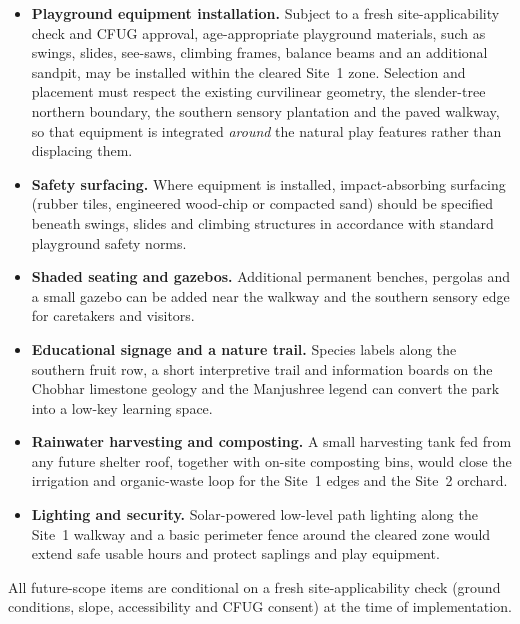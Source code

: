 \documentclass[11pt,a4paper]{article}
\begin{document}
\begin{itemize}
  \item \textbf{Playground equipment installation.} Subject to a fresh site-applicability check and CFUG approval, age-appropriate playground materials, such as swings, slides, see-saws, climbing frames, balance beams and an additional sandpit, may be installed within the cleared Site~1 zone. Selection and placement must respect the existing curvilinear geometry, the slender-tree northern boundary, the southern sensory plantation and the paved walkway, so that equipment is integrated \emph{around} the natural play features rather than displacing them.
  \item \textbf{Safety surfacing.} Where equipment is installed, impact-absorbing surfacing (rubber tiles, engineered wood-chip or compacted sand) should be specified beneath swings, slides and climbing structures in accordance with standard playground safety norms.
  \item \textbf{Shaded seating and gazebos.} Additional permanent benches, pergolas and a small gazebo can be added near the walkway and the southern sensory edge for caretakers and visitors.
  \item \textbf{Educational signage and a nature trail.} Species labels along the southern fruit row, a short interpretive trail and information boards on the Chobhar limestone geology and the Manjushree legend can convert the park into a low-key learning space.
  \item \textbf{Rainwater harvesting and composting.} A small harvesting tank fed from any future shelter roof, together with on-site composting bins, would close the irrigation and organic-waste loop for the Site~1 edges and the Site~2 orchard.
  \item \textbf{Lighting and security.} Solar-powered low-level path lighting along the Site~1 walkway and a basic perimeter fence around the cleared zone would extend safe usable hours and protect saplings and play equipment.
\end{itemize}

All future-scope items are conditional on a fresh site-applicability check (ground conditions, slope, accessibility and CFUG consent) at the time of implementation.
\end{document}

